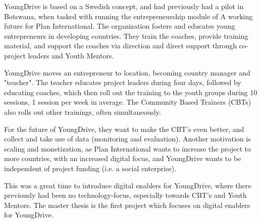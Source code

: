     YoungDrive is based on a Swedish concept, and had previously had a pilot in Botswana, when tasked with running the entrepreneurship module of A working future for Plan International. The organization fosters and educates young entrepreneurs in developing countries. They train the coaches, provide training material, and support the coaches via direction and direct support through co-project leaders and Youth Mentors.

    YoungDrive moves an entrepreneur to location, becoming country manager and "teacher". The teacher educates project leaders during four days, followed by educating coaches, which then roll out the training to the youth groups during 10 sessions, 1 session per week in average. The Community Based Trainers (CBTs) also rolls out other trainings, often simultaneously.

    For the future of YoungDrive, they want to make the CBT's even better, and collect and take use of data (monitoring and evaluation). Another motivation is scaling and monetization, as Plan International wants to increase the project to more countries, with an increased digital focus, and YoungDrive wants to be independent of project funding (i.e. a social enterprise).

    This was a great time to introduce digital enablers for YoungDrive, where there previously had been no technology-focus, especially towards CBT's and Youth Mentors. The master thesis is the first project which focuses on digital enablers for YoungDrive.
